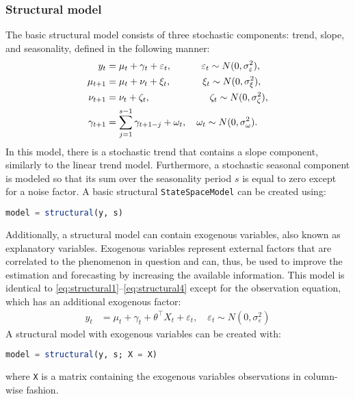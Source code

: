\documentclass{juliacon}
\begin{document}
\subsubsection{Structural model}

The basic structural model consists of three stochastic components: trend, slope, and seasonality, defined in the following manner:
%
\begin{align}
    y_{t} &= \mu_{t} + \gamma_{t} + \varepsilon_{t}, \hspace{0.09\columnwidth} \varepsilon_{t} \sim N(0, \sigma^{2}_\varepsilon), \label{eq:structural1} \\
    \mu_{t+1} &= \mu_{t} + \nu_{t} + \xi_{t}, \hspace{0.095\columnwidth} \xi_{t} \sim N(0, \sigma^{2}_\xi), \label{eq:structural2} \\
    \nu_{t+1} &= \nu_{t} + \zeta_{t}, \hspace{0.18\columnwidth} \zeta_{t} \sim N(0, \sigma^{2}_\zeta), \label{eq:structural3} \\
    \gamma_{t+1} &= \sum_{j=1}^{s-1} \gamma_{t+1-j} + \omega_{t}, \quad \omega_{t} \sim N(0, \sigma^{2}_\omega). \label{eq:structural4}
\end{align}
%
In this model, there is a stochastic trend that contains a slope component, similarly to the linear trend model. Furthermore, a stochastic seasonal component is modeled so that its sum over the seasonality period $s$ is equal to zero except for a noise factor. A basic structural \texttt{StateSpaceModel} can be created using:
%
\begin{lstlisting}[language = Julia]
model = structural(y, s)
\end{lstlisting}

Additionally, a structural model can contain exogenous variables, also known as explanatory variables. Exogenous variables represent external factors that are correlated to the phenomenon in question and can, thus, be used to improve the estimation and forecasting by increasing the available information. This model is identical to \eqref{eq:structural1}--\eqref{eq:structural4} except for the observation equation, which has an additional exogenous factor:
%
\begin{align}
    y_{t} &= \mu_{t} + \gamma_{t} + \theta^{\top} X_{t} + \varepsilon_{t}, \quad \varepsilon_{t} \sim N(0, \sigma^{2}_\varepsilon) \label{eq:structural_exogenous}
\end{align}
%
A structural model with exogenous variables can be created with:
%
\begin{lstlisting}[language = Julia]
model = structural(y, s; X = X)
\end{lstlisting}
%
\noindent where \texttt{X} is a matrix containing the exogenous variables observations in column-wise fashion.
\end{document}
